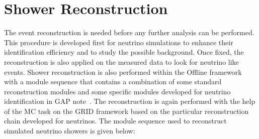 \section{Shower Reconstruction}
\label{sec:reco}

The event reconstruction is needed before any further analysis can be performed. This procedure is developed first for neutrino simulations to enhance their identification efficiency and to study the possible background. Once fixed, the reconstruction is also applied on the measured data to look for neutrino like events. Shower reconstruction is also performed within the Offline framework with a module sequence that contains a combination of some standard reconstruction modules and some specific modules developed for neutrino identification in GAP note~\cite{gap_note_2013}. The reconstruction is again performed with the help of the MC task on the GRID framework based on the particular reconstruction chain developed for neutrinos. The module sequence used to reconstruct simulated neutrino showers is given below:

